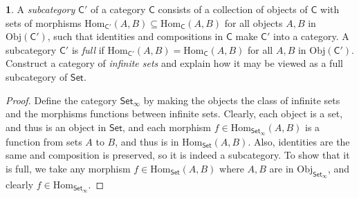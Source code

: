 \documentclass{article}
\newcounter{section-number}
\theoremstyle{definition}
\newtheorem{ex}{}[section-number]
\begin{document}
\begin{ex}
	A \textit{subcategory} $\mathsf{C}'$ of a category $\mathsf{C}$ consists of a collection of objects of $\mathsf{C}$ with sets of morphisms $\mathrm{Hom}_{\mathsf{C}'}(A, B) \subseteq \mathrm{Hom}_{\mathsf{C}}(A, B)$ for all objects $A, B$ in $\mathrm{Obj}(\mathsf{C}')$, such that identities and compositions in $\mathsf{C}$ make $\mathsf{C}'$ into a category.
	A subcategory $\mathsf{C}'$ is \textit{full} if $\mathrm{Hom}_{\mathsf{C}'}(A, B) = \mathrm{Hom}_{\mathsf{C}}(A, B)$ for all $A, B$ in $\mathrm{Obj}(\mathsf{C}')$.
	Construct a category of \textit{infinite sets} and explain how it may be viewed as a full subcategory of $\mathsf{Set}$.
\end{ex}
\begin{proof}
	Define the category $\mathsf{Set_\infty}$ by making the objects the class of infinite sets and the morphisms functions between infinite sets.
	Clearly, each object is a set, and thus is an object in $\mathsf{Set}$, and each morphism $f \in \mathrm{Hom}_\mathsf{Set_\infty}(A, B)$ is a function from sets $A$ to $B$, and thus is in $\mathrm{Hom}_{\mathsf{Set}}(A, B)$.
	Also, identities are the same and composition is preserved, so it is indeed a subcategory.
	To show that it is full, we take any morphism $f \in \mathrm{Hom}_{\mathsf{Set}}(A, B)$ where $A, B$ are in $\mathrm{Obj}_{\mathsf{Set_\infty}}$, and clearly $f \in \mathrm{Hom}_{\mathsf{Set}_\infty}$.
\end{proof}
\end{document}
